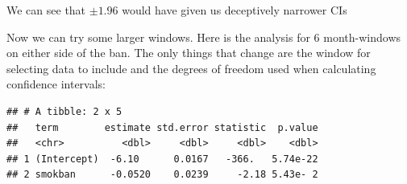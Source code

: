 \documentclass[
]{book}
\newenvironment{Shaded}{\begin{snugshade}}{\end{snugshade}}
\newcommand{\DataTypeTok}[1]{\textcolor[rgb]{0.13,0.29,0.53}{#1}}
\newcommand{\DecValTok}[1]{\textcolor[rgb]{0.00,0.00,0.81}{#1}}
\newcommand{\FloatTok}[1]{\textcolor[rgb]{0.00,0.00,0.81}{#1}}
\newcommand{\KeywordTok}[1]{\textcolor[rgb]{0.13,0.29,0.53}{\textbf{#1}}}
\newcommand{\NormalTok}[1]{#1}
\newcommand{\OperatorTok}[1]{\textcolor[rgb]{0.81,0.36,0.00}{\textbf{#1}}}
\newcommand{\StringTok}[1]{\textcolor[rgb]{0.31,0.60,0.02}{#1}}
\begin{document}
We can see that \(\pm 1.96\) would have given us deceptively narrower CIs

Now we can try some larger windows. Here is the analysis for 6 month-windows
on either side of the ban. The only things that change are the window for selecting data to include and the degrees of freedom used when calculating confidence intervals:

\begin{Shaded}
\end{Shaded}

\begin{verbatim}
## # A tibble: 2 x 5
##   term        estimate std.error statistic  p.value
##   <chr>          <dbl>     <dbl>     <dbl>    <dbl>
## 1 (Intercept)  -6.10      0.0167   -366.   5.74e-22
## 2 smokban      -0.0520    0.0239     -2.18 5.43e- 2
\end{verbatim}

\begin{Shaded}
\end{Shaded}
\end{document}
